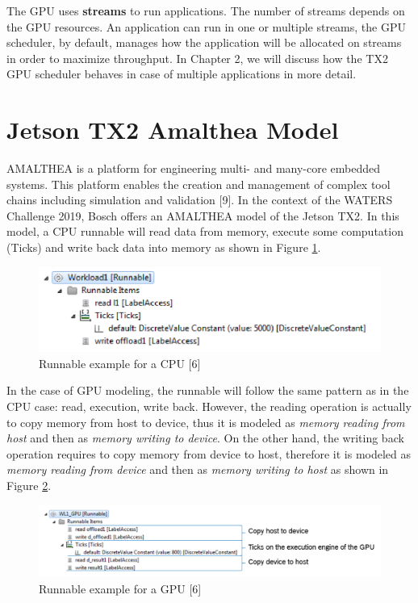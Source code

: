 \documentclass[
  12pt,
  a4paperpaper,
]{report}
\begin{document}
The GPU uses \textbf{streams} to run applications. The number of streams
depends on the GPU resources. An application can run in one or multiple
streams, the GPU scheduler, by default, manages how the application will
be allocated on streams in order to maximize throughput. In Chapter 2,
we will discuss how the TX2 GPU scheduler behaves in case
of multiple applications in more detail.

\hypertarget{jetson-tx2-amalthea-model}{%
\section{Jetson TX2 Amalthea Model}\label{jetson-tx2-amalthea-model}}

AMALTHEA is a platform for engineering multi- and many-core embedded
systems. This platform enables the creation and management of complex
tool chains including simulation and validation {[}9{]}. In the context
of the WATERS Challenge 2019, Bosch offers an AMALTHEA model of the Jetson
TX2. In this model, a CPU runnable will read data from memory, execute
some computation (Ticks) and write back data into memory as shown in
Figure \ref{img:amalthea01}.

\begin{figure}
\centering
\includegraphics{source/figures/amalthea-01.png}
\caption{Runnable example for a CPU {[}6{]} \label{img:amalthea01}}
\end{figure}

In the case of GPU modeling, the runnable will follow the same pattern
as in the CPU case: read, execution, write back. However, the reading
operation is actually to copy memory from host to device, thus it is
modeled as \emph{memory reading from host} and then as \emph{memory
writing to device}. On the other hand, the writing back operation
requires to copy memory from device to host, therefore it is modeled as
\emph{memory reading from device} and then as \emph{memory writing to
host} as shown in Figure \ref{img:amalthea02}.

\begin{figure}
\centering
\includegraphics{source/figures/amalthea-02.png}
\caption{Runnable example for a GPU {[}6{]} \label{img:amalthea02}}
\end{figure}
\end{document}
